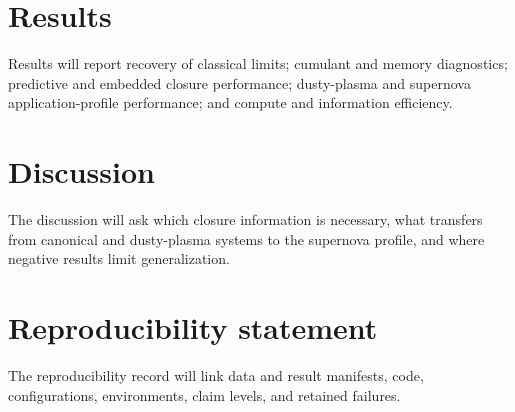 \documentclass[11pt]{article}
\begin{document}
\section{Results}
Results will report recovery of classical limits; cumulant and memory
diagnostics; predictive and embedded closure performance; dusty-plasma and
supernova application-profile performance; and compute and information
efficiency.

\section{Discussion}
The discussion will ask which closure information is necessary, what transfers
from canonical and dusty-plasma systems to the supernova profile, and where
negative results limit generalization.

\section{Reproducibility statement}
The reproducibility record will link data and result manifests, code,
configurations, environments, claim levels, and retained failures.
\end{document}
